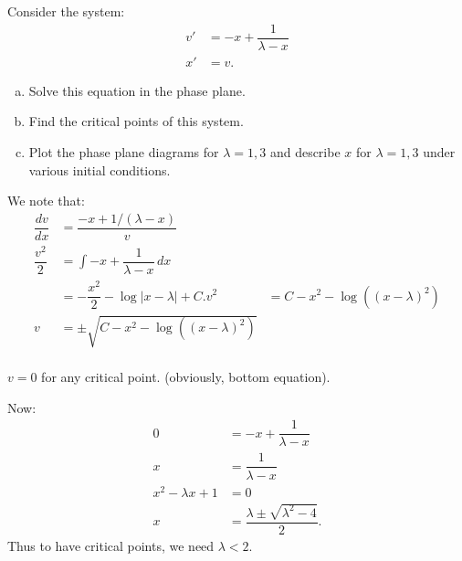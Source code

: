 \documentclass[11pt]{article}
\begin{document}
    \begin{problem}
        \setcounter{equation}{-1} \break
        Consider the system:
        \begin{align}
            v' &= -x+\dfrac{1}{\lambda - x} \\
            x' &= v.
        \end{align}
        \begin{enumerate}[(a)]
            \item Solve this equation in the phase plane.
            \item Find the critical points of this system. 
            \item Plot the phase plane diagrams for $\lambda=1,3$ and describe $x$ for $\lambda = 1,3$ under various initial conditions.
        \end{enumerate}
    \end{problem}
    \begin{solution}
        We note that:
        \begin{align}
            \dfrac{dv}{dx} &= \dfrac{-x+1/(\lambda -x)}{v} \\
            \dfrac{v^2}{2} &= \int -x+\dfrac{1}{\lambda - x} \, dx \\
            &= -\dfrac{x^2}{2}-\log|x-\lambda| + C.
            v^2  &= C-x^2 -\log((x-\lambda)^2) \\
            v &= \pm \sqrt{C-x^2 -\log((x-\lambda)^2)} \\
        \end{align}
    \end{solution}
    \begin{solution}
        \begin{observation}
            $v=0$ for any critical point. (obviously, bottom equation).
        \end{observation}
        Now:
        \begin{align}
            0 &= -x + \dfrac{1}{\lambda-x} \\
            x &= \dfrac{1}{\lambda - x} \\
            x^2 - \lambda x + 1 &= 0 \\
            x &= \dfrac{\lambda \pm \sqrt{\lambda^2 - 4}}{2}.
        \end{align}
        Thus to have critical points, we need $\lambda < 2$. 
    \end{solution}
\end{document}

